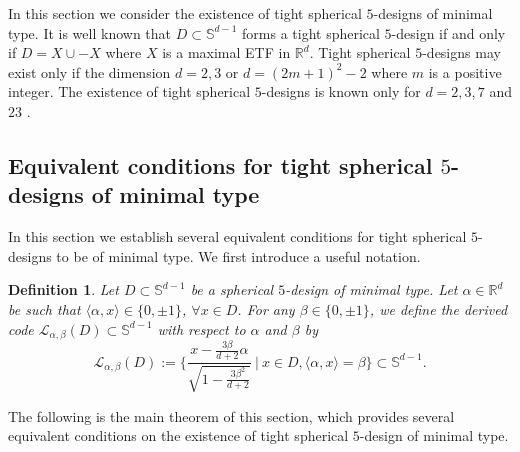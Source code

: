 \documentclass[11pt]{article}
\newtheorem{definition}{Definition}[section]
\theoremstyle{definition}
\theoremstyle{remark}
\begin{document}
In this section we consider the existence of tight spherical $5$-designs of minimal type. It is well known that $D\subset \mathbb{S}^{d-1}$ forms a tight spherical $5$-design if and only if $D=X\cup -X$ where $X$ is a maximal ETF in $\mathbb{R}^d$.
Tight spherical $5$-designs may exist only if the dimension $d=2,3$ or $d=(2m+1)^2-2$ where $m$ is a positive integer. The existence of tight spherical $5$-designs is known only for $d=2,3,7$ and $23$ \cite{BB09b}. 

\subsection{Equivalent conditions for tight spherical $5$-designs of minimal type}
In this section we establish several equivalent conditions for tight spherical $5$-designs to be of minimal type.
We first introduce a useful notation.
\begin{definition}
Let $D\subset\mathbb{S}^{d-1}$ be a spherical $5$-design of minimal type. 
Let $\alpha\in \mathbb{R}^d$ be such that $\langle \alpha,x\rangle\in\{0,\pm 1\}$, $\forall x\in D$.
For any $\beta\in\{0,\pm 1\}$, we define the derived code $\mathcal{L}_{\alpha,\beta}(D)\subset \mathbb{S}^{d-1}$ with respect to $\alpha$ and $\beta$ by
\begin{equation*}
\mathcal{L}_{\alpha,\beta}(D):=\Bigg\{\frac{x-\frac{3 \beta}{d+2}\alpha}{\sqrt{1-\frac{3\beta^2}{d+2}}} \ \Big|\    x\in D, \langle \alpha,x\rangle=\beta \Bigg\}\subset \mathbb{S}^{d-1}.
\end{equation*}
\end{definition}

The following is the main theorem of this section, which provides several equivalent conditions on the existence of tight spherical $5$-design of minimal type.
\end{document}
